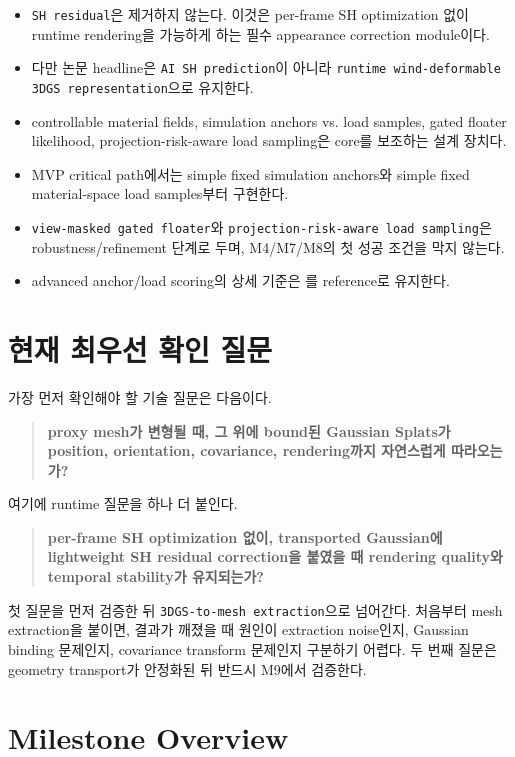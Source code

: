 \documentclass[10pt]{article}
\newcommand{\code}[1]{\texttt{#1}}
\begin{document}
\begin{itemize}
  \item \code{SH residual}은 제거하지 않는다. 이것은 per-frame SH optimization 없이 runtime rendering을 가능하게 하는 필수 appearance correction module이다.
  \item 다만 논문 headline은 \code{AI SH prediction}이 아니라 \code{runtime wind-deformable 3DGS representation}으로 유지한다.
  \item controllable material fields, simulation anchors vs. load samples, gated floater likelihood, projection-risk-aware load sampling은 core를 보조하는 설계 장치다.
  \item MVP critical path에서는 simple fixed simulation anchors와 simple fixed material-space load samples부터 구현한다.
  \item \code{view-masked gated floater}와 \code{projection-risk-aware load sampling}은 robustness/refinement 단계로 두며, M4/M7/M8의 첫 성공 조건을 막지 않는다.
  \item advanced anchor/load scoring의 상세 기준은 를 reference로 유지한다.
\end{itemize}

\section*{현재 최우선 확인 질문}

가장 먼저 확인해야 할 기술 질문은 다음이다.

\begin{quote}
\textbf{proxy mesh가 변형될 때, 그 위에 bound된 Gaussian Splats가 position, orientation, covariance, rendering까지 자연스럽게 따라오는가?}
\end{quote}

여기에 runtime 질문을 하나 더 붙인다.

\begin{quote}
\textbf{per-frame SH optimization 없이, transported Gaussian에 lightweight SH residual correction을 붙였을 때 rendering quality와 temporal stability가 유지되는가?}
\end{quote}

첫 질문을 먼저 검증한 뒤 \code{3DGS-to-mesh extraction}으로 넘어간다. 처음부터 mesh extraction을 붙이면, 결과가 깨졌을 때 원인이 extraction noise인지, Gaussian binding 문제인지, covariance transform 문제인지 구분하기 어렵다. 두 번째 질문은 geometry transport가 안정화된 뒤 반드시 M9에서 검증한다.

\section*{Milestone Overview}
\end{document}
